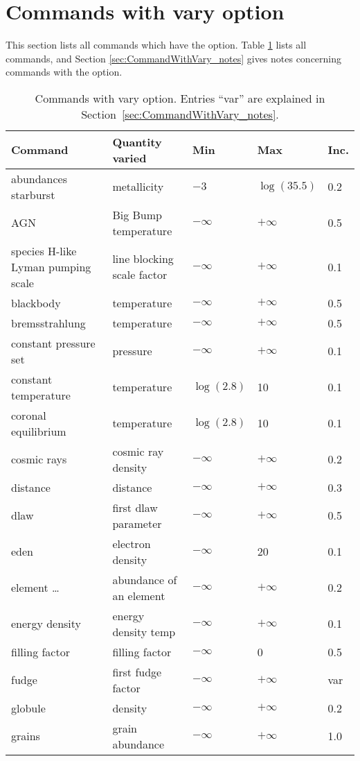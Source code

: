 \section{Commands with vary option}
\label{sec:CommandsVaryOption}

This section lists all commands which have the  option.
Table \ref{tab:CommandWithVaryOption} lists all commands, and
Section \ref{sec:CommandWithVary_notes} gives notes concerning commands 
with the  option.

\begin{table}
\centering
\caption{\label{tab:CommandWithVaryOption}Commands with vary option. Entries ``var'' are explained in Section~\ref{sec:CommandWithVary_notes}.}
\begin{tabular}{lllll}
\hline
Command& Quantity varied& Min& Max& Inc.\\
\hline
abundances starburst& metallicity& $-3$& $\log(35.5)$& 0.2\\
AGN& Big Bump temperature& $-\infty$& $+\infty$& 0.5\\
species H-like Lyman pumping scale & line blocking scale factor& $-\infty$& $+\infty$& 0.1\\
blackbody& temperature& $-\infty$& $+\infty$& 0.5\\
bremsstrahlung& temperature& $-\infty$& $+\infty$& 0.5\\
constant pressure set& pressure& $-\infty$& $+\infty$& 0.1\\
constant temperature& temperature& $\log(2.8)$& 10& 0.1\\
coronal equilibrium& temperature& $\log(2.8)$& 10& 0.1\\
cosmic rays& cosmic ray density& $-\infty$& $+\infty$& 0.2\\
distance& distance& $-\infty$& $+\infty$& 0.3\\
dlaw& first dlaw parameter& $-\infty$& $+\infty$& 0.5\\
eden& electron density& $-\infty$& 20 & 0.1\\
element \ldots& abundance of an element& $-\infty$& $+\infty$& 0.2\\
energy density& energy density temp& $-\infty$& $+\infty$& 0.1\\
filling factor& filling factor& $-\infty$& 0& 0.5\\
fudge& first fudge factor& $-\infty$& $+\infty$& var\\
globule& density& $-\infty$& $+\infty$& 0.2\\
grains& grain abundance& $-\infty$& $+\infty$& 1.0\\

\end{tabular}
\end{table}
